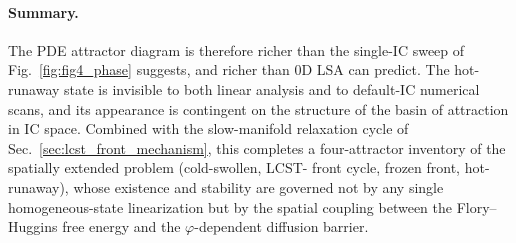 \paragraph{Summary.}
The PDE attractor diagram is therefore richer than the single-IC
sweep of Fig.~\ref{fig:fig4_phase} suggests, and richer than 0D LSA
can predict.  The hot-runaway state is invisible to both linear
analysis and to default-IC numerical scans, and its appearance is
contingent on the structure of the basin of attraction in IC space.
Combined with the slow-manifold relaxation cycle of
Sec.~\ref{sec:lcst_front_mechanism}, this completes a four-attractor
inventory of the spatially extended problem (cold-swollen, LCST-
front cycle, frozen front, hot-runaway), whose existence and
stability are governed not by any single homogeneous-state
linearization but by the spatial coupling between the Flory--Huggins
free energy and the $\varphi$-dependent diffusion barrier.
